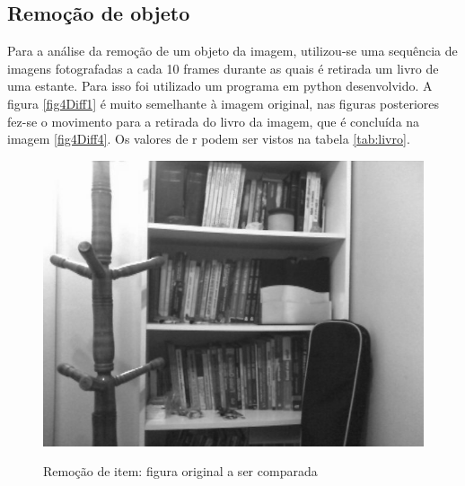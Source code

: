 \documentclass[10pt,a4paper]{article}
\begin{document}
\newpage
\subsection{Remoção de objeto}
Para a análise da remoção de um objeto da imagem, utilizou-se uma
sequência de imagens fotografadas a cada 10 frames durante as quais é retirada
um livro de uma estante. Para isso foi utilizado um programa em  python
desenvolvido.
A figura \ref{fig4Diff1} é muito semelhante à imagem original, nas
figuras posteriores fez-se o movimento para a retirada do livro da
imagem, que é concluída na imagem \ref{fig4Diff4}.
Os valores de r podem ser vistos na tabela \ref{tab:livro}.

\begin{figure}[h!]
  \begin{center}
    \includegraphics[scale=0.25]{photos/livros/gBase} \label{livro}
    \caption{Remoção de item: figura original a ser comparada}
  \end{center}
\end{figure}
\vspace{-0.5cm}
\end{document}
